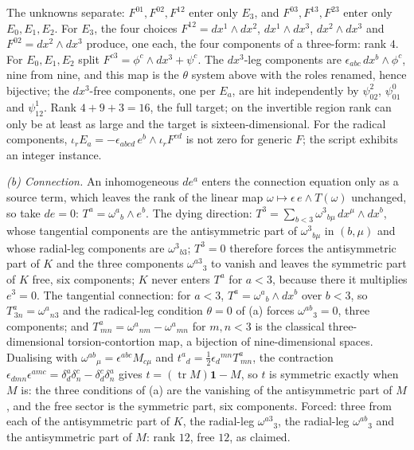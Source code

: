 The unknowns separate: $F^{01}, F^{02}, F^{12}$ enter only $E_3$, and $F^{03}, F^{13}, F^{23}$ enter only $E_0, E_1, E_2$. For $E_3$, the four choices $F^{12} = dx^1\wedge dx^2$, $dx^1\wedge dx^3$, $dx^2\wedge dx^3$ and $F^{02} = dx^2\wedge dx^3$ produce, one each, the four components of a three-form: rank $4$. For $E_0, E_1, E_2$ split $F^{c3} = \phi^c\wedge dx^3 + \psi^c$. The $dx^3$-leg components are $\epsilon_{abc}\,dx^b\wedge\phi^c$, nine from nine, and this map is the $\theta$ system above with the roles renamed, hence bijective; the $dx^3$-free components, one per $E_a$, are hit independently by $\psi^2_{02}$, $\psi^0_{01}$ and $\psi^1_{12}$. Rank $4 + 9 + 3 = 16$, the full target; on the invertible region rank can only be at least as large and the target is sixteen-dimensional. For the radical components, $\iota_r E_a = -\epsilon_{abcd}\,e^b\wedge\iota_r F^{cd}$ is not zero for generic $F$; the script exhibits an integer instance.

\emph{(b) Connection.} An inhomogeneous $de^a$ enters the connection equation only as a source term, which leaves the rank of the linear map $\omega \mapsto \epsilon\,e\wedge T(\omega)$ unchanged, so take $de = 0$: $T^a = \omega^{a}{}_{b}\wedge e^b$. The dying direction: $T^3 = \sum_{b<3}\omega^{3}{}_{b\mu}\,dx^\mu\wedge dx^b$, whose tangential components are the antisymmetric part of $\omega^{3}{}_{b\mu}$ in $(b,\mu)$ and whose radial-leg components are $\omega^{3}{}_{b3}$; $T^3 = 0$ therefore forces the antisymmetric part of $K$ and the three components $\omega^{a3}{}_{3}$ to vanish and leaves the symmetric part of $K$ free, six components; $K$ never enters $T^a$ for $a < 3$, because there it multiplies $e^3 = 0$. The tangential connection: for $a < 3$, $T^a = \omega^{a}{}_{b}\wedge dx^b$ over $b < 3$, so $T^a_{\,3n} = \omega^{a}{}_{n3}$ and the radical-leg condition $\theta = 0$ of (a) forces $\omega^{ab}{}_{3} = 0$, three components; and $T^a_{\,mn} = \omega^{a}{}_{nm} - \omega^{a}{}_{mn}$ for $m,n < 3$ is the classical three-dimensional torsion-contortion map, a bijection of nine-dimensional spaces. Dualising with $\omega^{ab}{}_{\mu} = \epsilon^{abc}M_{c\mu}$ and $t^{a}{}_{d} = \tfrac12\epsilon_{d}{}^{mn}T^a_{\,mn}$, the contraction $\epsilon_{dmn}\epsilon^{amc} = \delta^a_d\delta^c_n - \delta^c_d\delta^a_n$ gives $t = (\operatorname{tr}M)\mathbf{1} - M$, so $t$ is symmetric exactly when $M$ is: the three conditions of (a) are the vanishing of the antisymmetric part of $M$, and the free sector is the symmetric part, six components. Forced: three from each of the antisymmetric part of $K$, the radial-leg $\omega^{a3}{}_{3}$, the radial-leg $\omega^{ab}{}_{3}$ and the antisymmetric part of $M$: rank $12$, free $12$, as claimed.


